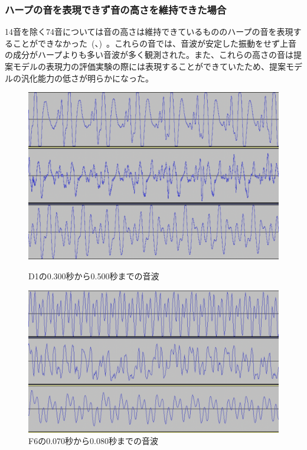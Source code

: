\clearpage

\subsubsection{ハープの音を表現できず音の高さを維持できた場合}

14音を除く74音については音の高さは維持できているもののハープの音を表現することができなかった~(、)~。これらの音では、音波が安定した振動をせず上音の成分がハープよりも多い音波が多く観測された。また、これらの高さの音は提案モデルの表現力の評価実験の際には表現することができていたため、提案モデルの汎化能力の低さが明らかになった。

\begin{figure}[b]
\centering
\begin{minipage}{0.48\columnwidth}
\centering
\includegraphics[width=0.75\columnwidth]{figure/66_22_det/d1_0300_0500.png}
\caption[D1の音波]{D1の0.300秒から0.500秒までの音波}
\label{fig:66_22_bad1}
\end{minipage}
\begin{minipage}{0.48\columnwidth}
\centering
\includegraphics[width=0.85\columnwidth]{figure/66_22_det/f6_0070_0080.png}
\caption[F6の音波]{F6の0.070秒から0.080秒までの音波}
\label{fig:66_22_bad2}
\end{minipage}
\end{figure}

